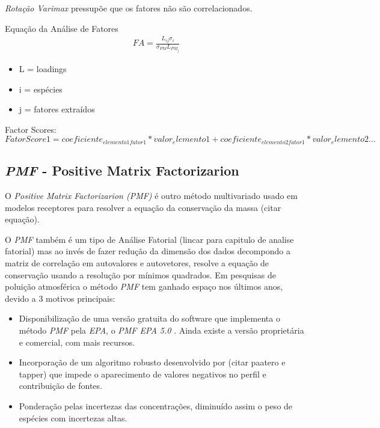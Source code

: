\textit{Rotação Varimax} pressupõe que os fatores não são correlacionados.

Equação da Análise de Fatores
\begin{eqnarray}
FA = \frac{L_{ij}\sigma_i}{\sigma_{PM}L_{PM_j}}
\end{eqnarray}

\begin{itemize}
  \item L = loadings
  \item i = espécies
  \item j = fatores extraídos
\end{itemize}

Factor Scores: 
\begin{equation}
FatorScore1 = coeficiente_{elemento1 fator1}*valor_elemento1 + coeficiente_{elemento2 fator1}*valor_elemento2 ...
\end{equation} 

\subsection{\textit{PMF} - Positive Matrix Factorizarion}

O \textit{Positive Matrix Factorizarion (PMF)} é outro método multivariado usado
em modelos receptores para resolver a equação da conservação da massa 
(citar equação).



O \textit{PMF} também é um tipo de Análise Fatorial (lincar para capitulo de analise fatorial)
mas ao invés de fazer redução da dimensão dos dados decompondo a matriz de 
correlação em autovalores e autovetores, resolve a equação de conservação 
usando a resolução por mínimos quadrados. Em pesquisas de poluição atmosférica 
o método \textit{PMF} tem ganhado espaço nos últimos anos, devido a 3 motivos 
principais:

\begin{itemize}
  \item Disponibilização de uma versão gratuita do software que implementa 
        o método \textit{PMF} pela \textit{EPA}, o \textit{PMF EPA 5.0} 
        \citep{Norris:2014}. 
        Ainda existe a versão proprietária e comercial, com mais recursos.   
  \item Incorporação de um algoritmo robusto desenvolvido por (citar paatero e tapper) 
        que impede o aparecimento de valores negativos no perfil e 
        contribuição de fontes.
  \item Ponderação pelas incertezas das concentrações, diminuído assim o peso 
        de espécies com incertezas altas.
\end{itemize}  

